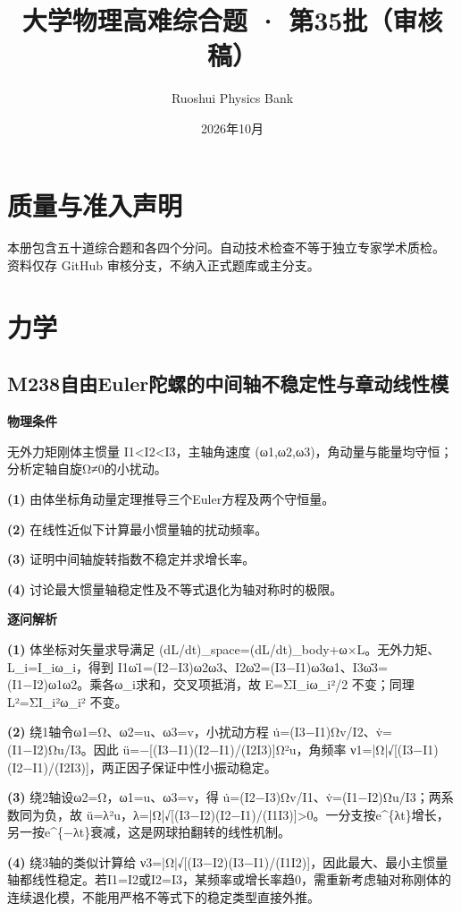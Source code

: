 \documentclass[UTF8,a4paper,11pt,oneside,openany]{ctexbook}
\begin{document}
\title{大学物理高难综合题 · 第35批（审核稿）}
\author{Ruoshui Physics Bank}
\date{2026年10月}
\maketitle
\tableofcontents
\chapter*{质量与准入声明}
本册包含五十道综合题和各四个分问。自动技术检查不等于独立专家学术质检。
资料仅存 GitHub 审核分支，不纳入正式题库或主分支。

\chapter{力学}
\section*{M238\quad 自由Euler陀螺的中间轴不稳定性与章动线性模}
\textbf{物理条件}\par 无外力矩刚体主惯量 I1<I2<I3，主轴角速度 (ω1,ω2,ω3)，角动量与能量均守恒；分析定轴自旋Ω≠0的小扰动。
\par\noindent\textbf{(1)} 由体坐标角动量定理推导三个Euler方程及两个守恒量。
\par\noindent\textbf{(2)} 在线性近似下计算最小惯量轴的扰动频率。
\par\noindent\textbf{(3)} 证明中间轴旋转指数不稳定并求增长率。
\par\noindent\textbf{(4)} 讨论最大惯量轴稳定性及不等式退化为轴对称时的极限。

\par\medskip\noindent\textbf{逐问解析}
\par\noindent\textbf{(1)} 体坐标对矢量求导满足 (dL/dt)\_space=(dL/dt)\_body+ω×L。无外力矩、L\_i=I\_iω\_i，得到 I1ω̇1=(I2−I3)ω2ω3、I2ω̇2=(I3−I1)ω3ω1、I3ω̇3=(I1−I2)ω1ω2。乘各ω\_i求和，交叉项抵消，故 E=ΣI\_iω\_i²/2 不变；同理 L²=ΣI\_i²ω\_i² 不变。
\par\noindent\textbf{(2)} 绕1轴令ω1=Ω、ω2=u、ω3=v，小扰动方程 u̇=(I3−I1)Ωv/I2、v̇=(I1−I2)Ωu/I3。因此 ü=−[(I3−I1)(I2−I1)/(I2I3)]Ω²u，角频率 ν1=|Ω|√[(I3−I1)(I2−I1)/(I2I3)]，两正因子保证中性小振动稳定。
\par\noindent\textbf{(3)} 绕2轴设ω2=Ω，ω1=u、ω3=v，得 u̇=(I2−I3)Ωv/I1、v̇=(I1−I2)Ωu/I3；两系数同为负，故 ü=λ²u，λ=|Ω|√[(I3−I2)(I2−I1)/(I1I3)]>0。一分支按e\textasciicircum{}\{λt\}增长，另一按e\textasciicircum{}\{−λt\}衰减，这是网球拍翻转的线性机制。
\par\noindent\textbf{(4)} 绕3轴的类似计算给 ν3=|Ω|√[(I3−I2)(I3−I1)/(I1I2)]，因此最大、最小主惯量轴都线性稳定。若I1=I2或I2=I3，某频率或增长率趋0，需重新考虑轴对称刚体的连续退化模，不能用严格不等式下的稳定类型直接外推。
\end{document}
